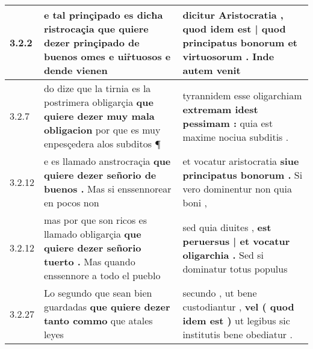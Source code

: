 \begin{tabular}{|p{1cm}|p{6.5cm}|p{6.5cm}|}
3.2.2 & e tal prinçipado es dicħa ristrocaçia \textbf{ que quiere dezer prinçipado de buenos omes } e uir̉tuosos e dende vienen & dicitur Aristocratia , \textbf{ quod idem est | quod principatus bonorum et virtuosorum . } Inde autem venit \\\hline
3.2.7 & do dize que la tirnia es la postrimera obligarçia \textbf{ que quiere dezer muy mala obligacion } por que es muy enpesçedera alos subditos ¶ & tyrannidem esse oligarchiam \textbf{ extremam idest pessimam : } quia est maxime nociua subditis . \\\hline
3.2.12 & e es llamado anstrocraçia \textbf{ que quiere dezer señorio de buenos . } Mas si enssennorear en pocos non & et vocatur aristocratia \textbf{ siue principatus bonorum . } Si vero dominentur non quia boni , \\\hline
3.2.12 & mas por que son ricos es llamado obligarçia \textbf{ que quiere dezer señorio tuerto . } Mas quando enssennore a todo el pueblo & sed quia diuites , \textbf{ est peruersus | et vocatur oligarchia . } Sed si dominatur totus populus \\\hline
3.2.27 & Lo segundo que sean bien guardadas \textbf{ que quiere dezer tanto commo } que atales leyes & secundo , ut bene custodiantur , \textbf{ vel ( quod idem est ) } ut legibus sic institutis bene obediatur . \\\hline

\end{tabular}

